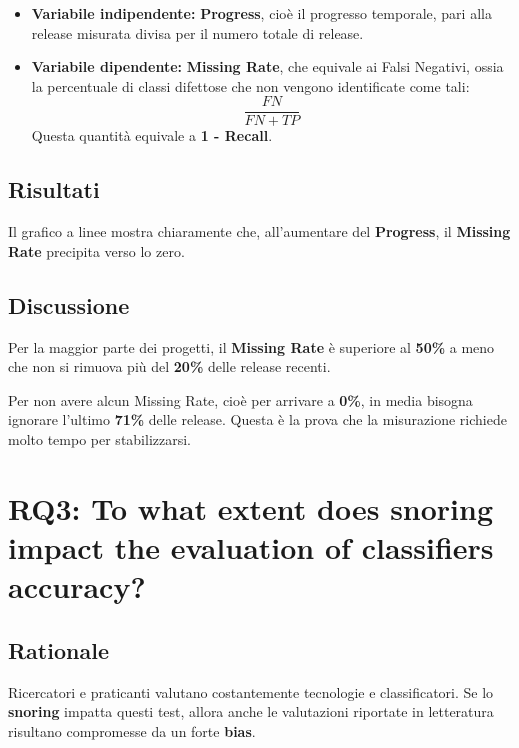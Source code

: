 \begin{itemize}
    \item \textbf{Variabile indipendente:} \textbf{Progress}, cioè il progresso temporale, pari alla release misurata divisa per il numero totale di release.
    \item \textbf{Variabile dipendente:} \textbf{Missing Rate}, che equivale ai Falsi Negativi, ossia la percentuale di classi difettose che non vengono identificate come tali:
    \[
        \frac{FN}{FN + TP}
    \]
    Questa quantità equivale a \textbf{1 - Recall}.
\end{itemize}

\subsection{Risultati}

Il grafico a linee mostra chiaramente che, all'aumentare del \textbf{Progress}, il \textbf{Missing Rate} precipita verso lo zero.

\subsection{Discussione}

Per la maggior parte dei progetti, il \textbf{Missing Rate} è superiore al \textbf{50\%} a meno che non si rimuova più del \textbf{20\%} delle release recenti.

\begin{notaprof}
Per non avere alcun Missing Rate, cioè per arrivare a \textbf{0\%}, in media bisogna ignorare l'ultimo \textbf{71\%} delle release. Questa è la prova che la misurazione richiede molto tempo per stabilizzarsi.
\end{notaprof}

\section{RQ3: To what extent does snoring impact the evaluation of classifiers accuracy?}

\subsection{Rationale}

Ricercatori e praticanti valutano costantemente tecnologie e classificatori. Se lo \textbf{snoring} impatta questi test, allora anche le valutazioni riportate in letteratura risultano compromesse da un forte \textbf{bias}.

